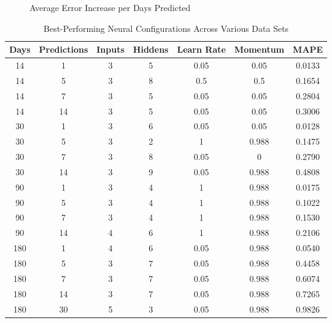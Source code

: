 \documentclass[a4paper,12pt]{article}
\begin{document}
	\begin{figure}[!htbp]
		\centering
		\caption{Average Error Increase per Days Predicted}
		\label{prediction_slope}
	\end{figure}

\clearpage
\newpage

	\begin{table}[]
		\centering
		\begin{tabular}{@{}cc|cccc|c@{}}
			\toprule
			{\fontseries{b}\selectfont Days} & {\fontseries{b}\selectfont Predictions} & {\fontseries{b}\selectfont Inputs} & {\fontseries{b}\selectfont Hiddens} & {\fontseries{b}\selectfont Learn Rate} & {\fontseries{b}\selectfont Momentum} & {\fontseries{b}\selectfont MAPE} \\ \midrule
			14 & 1 & 3 & 5 & 0.05 & 0.05 & 0.0133 \\
			14 & 5 & 3 & 8 & 0.5 & 0.5 & 0.1654 \\
			14 & 7 & 3 & 5 & 0.05 & 0.05 & 0.2804 \\
			14 & 14 & 3 & 5 & 0.05 & 0.05 & 0.3006 \\ \midrule
			30 & 1 & 3 & 6 & 0.05 & 0.05 & 0.0128 \\
			30 & 5 & 3 & 2 & 1 & 0.988 & 0.1475 \\
			30 & 7 & 3 & 8 & 0.05 & 0 & 0.2790 \\
			30 & 14 & 3 & 9 & 0.05 & 0.988 & 0.4808 \\ \midrule
			90 & 1 & 3 & 4 & 1 & 0.988 & 0.0175 \\
			90 & 5 & 3 & 4 & 1 & 0.988 & 0.1022 \\
			90 & 7 & 3 & 4 & 1 & 0.988 & 0.1530 \\
			90 & 14 & 4 & 6 & 1 & 0.988 & 0.2106 \\ \midrule
			180 & 1 & 4 & 6 & 0.05 & 0.988 & 0.0540 \\
			180 & 5 & 3 & 7 & 0.05 & 0.988 & 0.4458 \\
			180 & 7 & 3 & 7 & 0.05 & 0.988 & 0.6074 \\
			180 & 14 & 3 & 7 & 0.05 & 0.988 & 0.7265 \\
			180 & 30 & 5 & 3 & 0.05 & 0.988 & 0.9826 \\ \bottomrule
		\end{tabular}
		\caption{Best-Performing Neural Configurations Across Various Data Sets}
		\label{predslope}
	\end{table}
	
\end{document}

